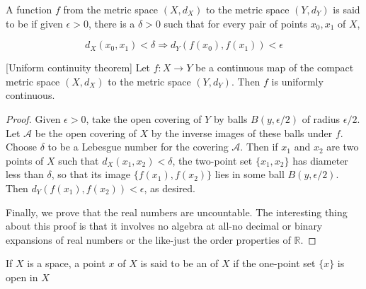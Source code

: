 \begin{definition}
 A function \(f\) from the metric space \(( {X,d_{X}})\) to the metric space \(( {Y,d_{Y}})\) is said to be  if given \(\epsilon > 0\), there is a \(\delta > 0\) such that for every pair of points \(x_{0},x_{1}\) of \(X\),

\[
d_{X}( {x_{0},x_{1}}) < \delta \Rightarrow {d}_{Y}( {f( x_{0}),f( x_{1}) }) < \epsilon
\]
\end{definition}

\begin{theorem}
\label{thm:\thetheorem}[Uniform continuity theorem]
 Let \(f : X \rightarrow Y\) be a continuous map of the compact metric space \(( {X,d_{X}})\) to the metric space \(( {Y,d_{Y}})\). Then \(f\) is uniformly continuous.

\end{theorem}
\begin{proof}
Given \(\epsilon > 0\), take the open covering of \(Y\) by balls \(B( {y,\epsilon /2})\) of radius \(\epsilon /2\). Let \(\mathcal{A}\) be the open covering of \(X\) by the inverse images of these balls under \(f\). Choose \(\delta\) to be a Lebesgue number for the covering \(\mathcal{A}\). Then if \(x_{1}\) and \(x_{2}\) are two points of \(X\) such that \(d_{X}( {x_{1},x_{2}}) < \delta\), the two-point set \(\{ {x_{1},x_{2}}\}\) has diameter less than \(\delta\), so that its image \(\{ {f( x_{1}),f( x_{2}) }\}\) lies in some ball \(B( {y,\epsilon /2})\). Then \(d_{Y}( {f( x_{1}),f( x_{2}) }) < \epsilon\), as desired.

Finally, we prove that the real numbers are uncountable. The interesting thing about this proof is that it involves no algebra at all-no decimal or binary expansions of real numbers or the like-just the order properties of \(\mathbb{R}\).
\end{proof}

\begin{definition}
 If \(X\) is a space, a point \(x\) of \(X\) is said to be an  of \(X\) if the one-point set \(\{ x\}\) is open in \(X\)
\end{definition}

